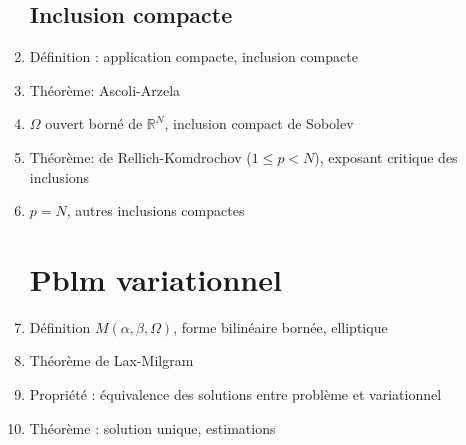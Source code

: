 \documentclass{article}
\begin{document}
\begin{enumerate}
\subsection{Inclusion compacte}
	\item Définition : application compacte, inclusion compacte
	\item Théorème: Ascoli-Arzela
	\item $\Omega$ ouvert borné de $\mathbb{R}^N$, inclusion compact de Sobolev
	\item Théorème: de Rellich-Komdrochov ($1\leq p<N$), exposant critique des inclusions
	\item $p=N$, autres inclusions compactes
\section{Pblm variationnel}
	\item Définition $M(\alpha,\beta,\Omega)$, forme bilinéaire bornée, elliptique
	\item Théorème de Lax-Milgram
	\item Propriété : équivalence des solutions entre problème et variationnel
	\item Théorème : solution unique, estimations
\end{enumerate}
\end{document}
